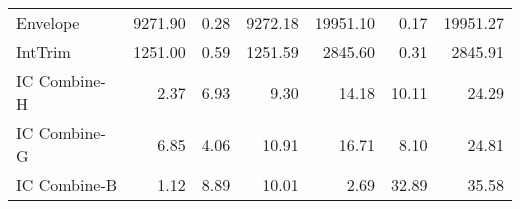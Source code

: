 \begin{tabular}{lrrrrrr}
Envelope            &  9271.90 &     0.28 &       9272.18 &  19951.10 &     0.17 &      19951.27 \\
IntTrim             &  1251.00 &     0.59 &       1251.59 &   2845.60 &     0.31 &       2845.91 \\
IC Combine-H        &     2.37 &     6.93 &          9.30 &     14.18 &    10.11 &         24.29 \\
IC Combine-G        &     6.85 &     4.06 &         10.91 &     16.71 &     8.10 &         24.81 \\
IC Combine-B        &     1.12 &     8.89 &         10.01 &      2.69 &    32.89 &         35.58 \\
\bottomrule
\end{tabular}
